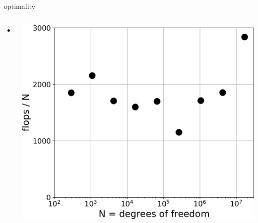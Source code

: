 \documentclass[svgnames,
               hyperref={colorlinks,citecolor=DeepPink4,linkcolor=FireBrick,urlcolor=Maroon},
               usepdftitle=false]  %
               {beamer}
\begin{document}
\begin{frame}{optimality}

\begin{columns}
\begin{column}{0.6\textwidth}
\begin{itemize}
\item x
\end{itemize}
\end{column}
\begin{column}{0.4\textwidth}
\includegraphics[width=\textwidth]{images/obstacle-flops-per-n.png}
\end{column}
\end{columns}
\end{frame}
\end{document}
